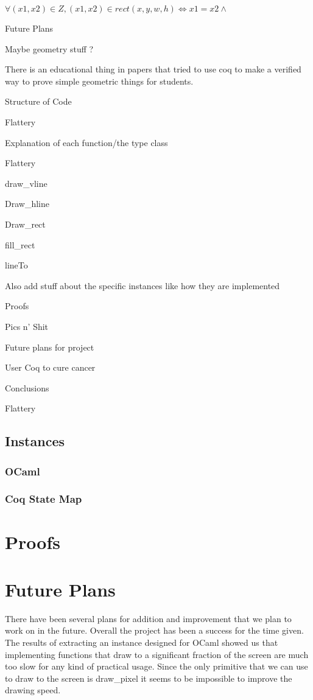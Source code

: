 \documentclass{llncs}
\begin{document}
$\forall (x1,x2) \in Z, (x1,x2) \in rect (x,y,w,h) \iff x1 = x2 \land $
\begin{section}{Future Plans}\end{section}
Maybe geometry stuff ? 

There is an educational thing in papers that tried to use coq to make a verified way to prove simple geometric things for students.

Structure of Code

Flattery

Explanation of each function/the type class

Flattery

draw\_vline

Draw\_hline

Draw\_rect

fill\_rect

lineTo

Also add stuff about the specific instances like how they are implemented

Proofs

Pics n’ Shit 

Future plans for project

User Coq to cure cancer 

Conclusions

Flattery


\subsection{Instances}
  \subsubsection{OCaml}
  \subsubsection{Coq State Map}


\section{Proofs}


\section{Future Plans}
There have been several plans for addition and improvement that we plan to work on in the future.  Overall the project has been a success for the
time given.  The results of extracting an instance designed for OCaml showed us that implementing functions that draw to a significant fraction of the screen are much too slow for any kind of practical usage.  Since the only primitive that we can use to draw to the screen is draw\_pixel it seems to be impossible to improve the drawing speed.
\end{document}
